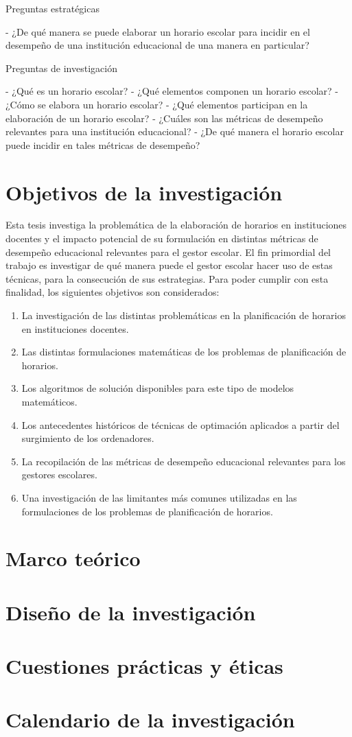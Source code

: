 \documentclass[draft,12pt,headsepline,footsepline,paper=letter]{scrreprt}
\begin{document}
Preguntas estratégicas

- ¿De qué manera se puede elaborar un horario escolar para incidir en el desempeño de una institución educacional de una manera en particular?

Preguntas de investigación

- ¿Qué es un horario escolar?
- ¿Qué elementos componen un horario escolar?
- ¿Cómo se elabora un horario escolar? 
- ¿Qué elementos participan en la elaboración de un horario escolar?
- ¿Cuáles son las métricas de desempeño relevantes para una institución educacional?
- ¿De qué manera el horario escolar puede incidir en tales métricas de desempeño?

\section{Objetivos de la investigación}

Esta tesis investiga la problemática de la elaboración de horarios en instituciones docentes y el impacto potencial de su formulación en distintas métricas de desempeño educacional relevantes para el gestor escolar. 
El fin primordial del trabajo es investigar de qué manera puede el gestor escolar hacer uso de estas técnicas, para la consecución de sus estrategias.
Para poder cumplir con esta finalidad, los siguientes objetivos son considerados:
\begin{enumerate}[1]
\item La investigación de las distintas problemáticas en la planificación de horarios en instituciones docentes.
\item Las distintas formulaciones matemáticas de los problemas de planificación de horarios.
\item Los algoritmos de solución disponibles para este tipo de modelos matemáticos.
\item Los antecedentes históricos de técnicas de optimación aplicados a partir del surgimiento de los ordenadores.
\item La recopilación de las métricas de desempeño educacional relevantes para los gestores escolares.
\item Una investigación de las limitantes más comunes utilizadas en las formulaciones de los problemas de planificación de horarios.
\end{enumerate}
\section{Marco teórico}
\section{Diseño de la investigación}
\section{Cuestiones prácticas y éticas}
\section{Calendario de la investigación}

\end{document}
